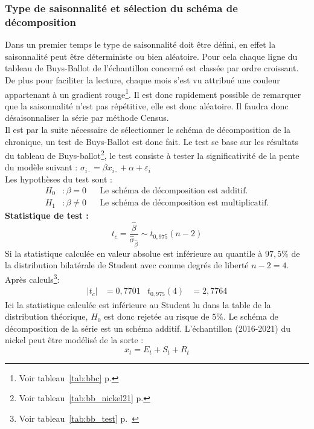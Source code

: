 \subsubsection{Type de saisonnalité et sélection du schéma de décomposition}
Dans un premier temps le type de saisonnalité doit être défini, en effet la saisonnalité peut être déterministe ou bien aléatoire. Pour cela chaque ligne du tableau de 
Buys-Ballot de l'échantillon concerné est classée par ordre croissant. De plus pour faciliter la lecture, chaque mois s'est vu attribué une couleur appartenant à
un gradient rouge\footnote{Voir tableau~\ref{tab:bbc} p.\pageref{tab:bbc} }. Il est donc rapidement possible de remarquer que la saisonnalité n'est pas répétitive,
elle est donc aléatoire. Il faudra donc désaisonnaliser la série par méthode Census.\\[11pt] 
Il est par la suite nécessaire de sélectionner le schéma de décomposition de la chronique, un test de Buys-Ballot est donc fait. Le test se base sur les résultats du 
tableau de Buys-ballot\footnote{Voir tableau~\ref{tab:bb_nickel21} p.\pageref{tab:bb_nickel21}}, le test consiste à tester la significativité de la pente du modèle 
suivant : 
$\sigma_{i\cdot} = \beta x_{i\cdot} + \alpha + \varepsilon_{i}$ \\[11pt]
Les hypothèses du test sont :
\begin{align*}
        H_{0} &: \beta = 0 & &\text{Le schéma de décomposition est additif.} \\
        H_{1} &: \beta \neq 0 &  &\text{Le schéma de décomposition est multiplicatif.}
\end{align*}
\textbf{Statistique de test :}
\begin{equation*}
    t_{c} = \frac{\hat{\beta}}{\hat{\sigma}_{\hat{\beta}}}\sim t_{0,975}(n-2)
\end{equation*}
Si la statistique calculée en valeur absolue est inférieure au quantile à $97,5\%$ de la distribution bilatérale de Student avec comme degrés de liberté $ n-2 = 4$. 
Après calculs\footnote{Voir tableau~\ref{tab:bb_test} p.~\pageref{tab:bb_test}}:
\begin{align*}
    |t_{c}| &= 0,7701  & t_{0,975}(4) &= 2,7764
\end{align*}
Ici la statistique calculée est inférieure au Student lu dans la table de la distribution théorique, $H_{0}$ est donc rejetée au risque de $5\%$. Le schéma de décomposition
de la série est un schéma additif. L'échantillon (2016-2021) du nickel peut être modélisé de la sorte :
\begin{equation*}
    x_{t} = E_{t} + S_{t} + R_{t}
\end{equation*}
